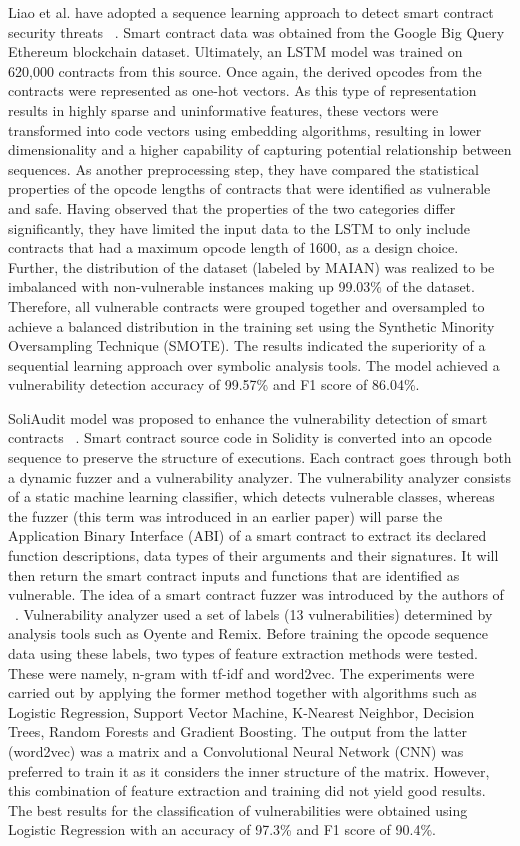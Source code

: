 Liao et al. have adopted a sequence learning approach to detect smart contract security threats ~\cite{madmax}.
Smart contract data was obtained from the Google Big Query Ethereum blockchain dataset.
Ultimately, an LSTM model was trained on 620,000 contracts from this source. Once again, the derived opcodes from the contracts were represented as one-hot vectors.
As this type of representation results in highly sparse and uninformative features, these vectors were transformed into code vectors using embedding algorithms,
resulting in lower dimensionality and a higher capability of capturing potential relationship between sequences.
As another preprocessing step, they have compared the statistical properties of the opcode lengths of contracts that were identified as vulnerable and safe.
Having observed that the properties of the two categories differ significantly, they have limited the input data to the LSTM to only include contracts that
had a maximum opcode length of 1600, as a design choice.
Further, the distribution of the dataset (labeled by MAIAN) was realized to be imbalanced with non-vulnerable instances making up 99.03\% of the dataset.
Therefore, all vulnerable contracts were grouped together and oversampled to achieve a balanced distribution in the training set using the Synthetic Minority Oversampling Technique (SMOTE).
The results indicated the superiority of a sequential learning approach over symbolic analysis tools.
The model achieved a vulnerability detection accuracy of 99.57\% and F1 score of 86.04\%.

SoliAudit model was proposed to enhance the vulnerability detection of smart contracts ~\cite{etehrTrust}.
Smart contract source code in Solidity is converted into an opcode sequence to preserve the structure of executions.
Each contract goes through both a dynamic fuzzer and a vulnerability analyzer.
The vulnerability analyzer consists of a static machine learning classifier, which detects vulnerable classes, whereas the fuzzer (this term was introduced in an earlier paper)
will parse the Application Binary Interface (ABI) of a smart contract to extract its declared function descriptions, data types of their arguments and their signatures.
It will then return the smart contract inputs and functions that are identified as vulnerable.
The idea of a smart contract fuzzer was introduced by the authors of ~\cite{etehrTrust}.
Vulnerability analyzer used a set of labels (13 vulnerabilities) determined by analysis tools such as Oyente and Remix.
Before training the opcode sequence data using these labels, two types of feature extraction methods were tested. These were namely, n-gram with tf-idf and word2vec.
The experiments were carried out by applying the former method together with algorithms such as Logistic Regression, Support Vector Machine, K-Nearest Neighbor, Decision Trees,
Random Forests and Gradient Boosting.
The output from the latter (word2vec) was a matrix and a Convolutional Neural Network (CNN) was preferred to train it as it considers the inner structure of the matrix.
However, this combination of feature extraction and training did not yield good results.
The best results for the classification of vulnerabilities were obtained using Logistic Regression with an accuracy of 97.3\% and F1 score of 90.4\%.

